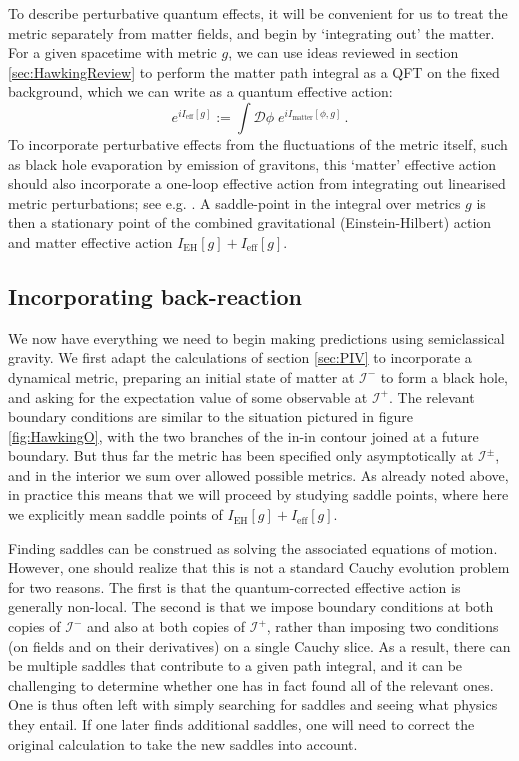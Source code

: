 \documentclass[letterpaper,12pt]{article}
\newcommand*{\scri}{\mathscr{I}} %
\begin{document}
To describe perturbative quantum effects, it will be convenient for us to treat the metric separately from matter fields, and begin by `integrating out' the matter. For a given spacetime with metric $g$, we can use ideas reviewed in section \ref{sec:HawkingReview} to perform the matter path integral as a QFT on the fixed background, which we can write as a quantum effective action:
\begin{equation}\label{eq:Ieff}
	e^{iI_\text{eff}[g]} := \int \mathcal{D}\phi \; e^{iI_\text{matter}[\phi,g]} \,.
\end{equation}
To incorporate perturbative effects from the fluctuations of the metric itself, such as black hole evaporation by emission of gravitons, this `matter' effective action should also incorporate a one-loop effective action from integrating out linearised metric perturbations; see e.g. \cite{Vilkovisky:1984st,DeWitt:1985sg}. A saddle-point in the integral over metrics $g$ is then a stationary point of the combined gravitational (Einstein-Hilbert) action and matter effective action $I_\text{EH}[g]+I_\text{eff}[g]$.

\subsection{Incorporating back-reaction}\label{sec:hawking}

We now have everything we need to begin making predictions using semiclassical gravity. We first adapt the calculations of section \ref{sec:PIV} to incorporate a  dynamical metric, preparing an initial state of matter at $\scri^-$ to form a black hole, and asking for the expectation value of some observable at $\scri^+$. The relevant boundary conditions are similar to the situation pictured in figure \ref{fig:HawkingO}, with the two branches of the in-in contour joined at a future boundary. But thus far the metric has been specified only asymptotically at $\scri^\pm$, and in the interior we sum over allowed possible metrics. As already noted above, in practice this means that we will proceed by studying saddle points, where here we explicitly mean saddle points of  $I_\text{EH}[g]+I_\text{eff}[g]$.

Finding saddles can be construed as solving the associated equations of motion.  However, one should realize that this is not a standard Cauchy evolution problem for two reasons.  The first is that the quantum-corrected effective action is generally non-local.  The second is that we impose boundary conditions at both copies of $\scri^-$ and also at both copies of $\scri^+$, rather than imposing two conditions (on fields and on their derivatives) on a single Cauchy slice.  As a result, there can be multiple saddles that contribute to a given path integral, and it can be challenging to determine whether one has in fact found all of the relevant ones.    One is thus often left with simply searching for saddles and seeing what physics they entail.  If one later finds additional saddles, one will need to correct the original calculation to take the new saddles into account.
\end{document}
